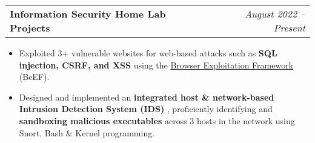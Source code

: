 \documentclass[letterpaper,11pt]{article}
\makeatletter
\newcommand{\resumeItem}[1]{
  \item\small{
    {#1 \vspace{-2pt}}
  }
}
\newcommand{\resumeProjectHeading}[2]{
    \item
    \begin{tabular*}{0.95\textwidth}{l@{\extracolsep{\fill}}r}
      \small#1 & #2 \\
    \end{tabular*}\vspace{-5pt}
}
\newcommand{\resumeItemListStart}{\begin{itemize}}
\newcommand{\resumeItemListEnd}{\end{itemize}\vspace{-5pt}}
\makeatother
\begin{document}
      \resumeProjectHeading
          {\textbf{Information Security Home Lab Projects}}{\textit{August 2022 -- Present}}
          \resumeItemListStart
            \resumeItem{Exploited 3+ vulnerable websites for web-based attacks such as \textbf{SQL injection, CSRF, and XSS} using the \color{blue} \href{https://beefproject.com/}{Browser Exploitation Framework} (BeEF).}
            \resumeItem{Designed and implemented an \textbf{integrated host \& network-based Intrusion Detection System (IDS)} , proficiently identifying and \textbf{sandboxing malicious executables} across 3 hosts in the network using Snort, Bash \& Kernel programming.}
            \resumeItemListEnd
          
    
\end{document}
